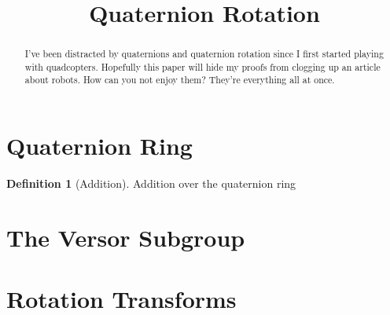 \documentclass{amsart}
\theoremstyle{definition}
\newtheorem{definition}[theorem]{Definition}
\theoremstyle{remark}
\numberwithin{equation}{section}
\begin{document}
\title{Quaternion Rotation}


\begin{abstract}
I've been distracted by quaternions and quaternion rotation since I first started playing with quadcopters. Hopefully this paper will hide my proofs from clogging up an article about robots. How can you not enjoy them? They're everything all at once.
\end{abstract}

\maketitle


\section{Quaternion Ring}

\begin{definition}[Addition]
  Addition over the quaternion ring
\end{definition}





\section{The Versor Subgroup}



\section{Rotation Transforms}

%
\end{document}
